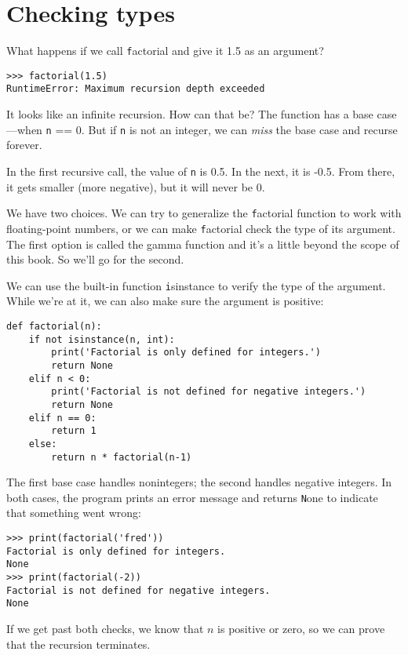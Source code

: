 \documentclass[
DIV=11,
fontsize=12,
twoside,
headinclude=false,
titlepage=firstiscover,
abstract=true,
headsepline=true,
footsepline=true,
chapterprefix=true, %
headings=big,
bibliography=totoc,%
captions=tableheading
]{scrbook}
\theoremstyle{definition}
\begin{document}
\section{Checking types}
\label{guardian}

What happens if we call {\texttt factorial} and give it 1.5 as an argument?

\begin{lstlisting}
>>> factorial(1.5)
RuntimeError: Maximum recursion depth exceeded
\end{lstlisting}
%
It looks like an infinite recursion.  How can that be?  The function
has a base case---when {\texttt n == 0}.  But if {\texttt n} is not an integer,
we can {\em miss} the base case and recurse forever.

In the first recursive call, the value of {\texttt n} is 0.5.
In the next, it is -0.5.  From there, it gets smaller
(more negative), but it will never be 0.

We have two choices.  We can try to generalize the {\texttt factorial}
function to work with floating-point numbers, or we can make {\texttt
  factorial} check the type of its argument.  The first option is
called the gamma function and it's a
little beyond the scope of this book.  So we'll go for the second.

We can use the built-in function {\texttt isinstance} to verify the type
of the argument.  While we're at it, we can also make sure the
argument is positive:

\begin{lstlisting}
def factorial(n):
    if not isinstance(n, int):
        print('Factorial is only defined for integers.')
        return None
    elif n < 0:
        print('Factorial is not defined for negative integers.')
        return None
    elif n == 0:
        return 1
    else:
        return n * factorial(n-1)
\end{lstlisting}
%
The first base case handles nonintegers; the
second handles negative integers.  In both cases, the program prints
an error message and returns {\texttt None} to indicate that something
went wrong:

\begin{lstlisting}
>>> print(factorial('fred'))
Factorial is only defined for integers.
None
>>> print(factorial(-2))
Factorial is not defined for negative integers.
None
\end{lstlisting}
% 
If we get past both checks, we know that $n$ is positive or
zero, so we can prove that the recursion terminates.
\end{document}
